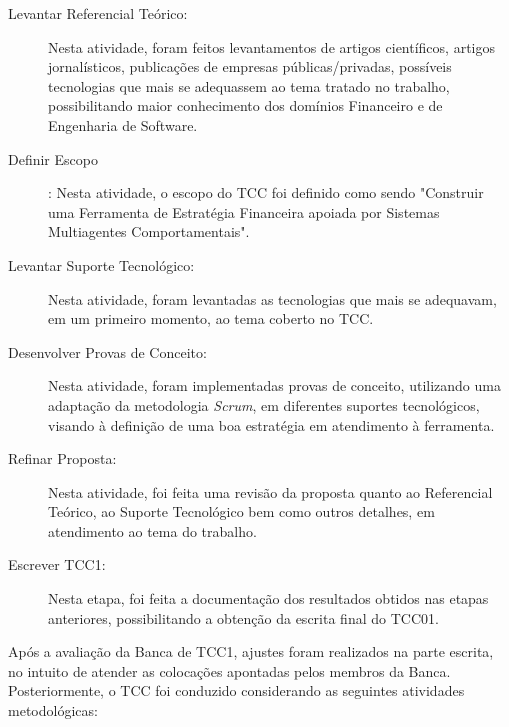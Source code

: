 \begin{description}
\item [Levantar Referencial Teórico:] Nesta atividade, foram feitos levantamentos de artigos científicos, artigos jornalísticos, publicações de empresas públicas/privadas, possíveis tecnologias que mais se adequassem ao tema tratado no trabalho, possibilitando maior conhecimento dos domínios Financeiro e de Engenharia de Software.

\item [Definir Escopo]:
Nesta atividade, o escopo do TCC foi definido como sendo "Construir uma Ferramenta de Estratégia Financeira apoiada por Sistemas Multiagentes Comportamentais".

\item [Levantar Suporte Tecnológico:] 
 Nesta atividade, foram levantadas as tecnologias que mais se adequavam, em um primeiro momento, ao tema coberto no TCC.

\item [Desenvolver Provas de Conceito:]
Nesta atividade, foram implementadas provas de conceito, utilizando uma adaptação da metodologia \textit{Scrum}, em diferentes suportes tecnológicos, visando à definição de uma boa estratégia em atendimento à ferramenta.

\item [Refinar Proposta:] 
Nesta atividade, foi feita uma revisão da proposta quanto ao Referencial Teórico, ao Suporte Tecnológico bem como outros detalhes, em atendimento ao tema do trabalho.

\item [Escrever TCC1:]
Nesta etapa, foi feita a documentação dos resultados obtidos nas etapas anteriores, possibilitando a obtenção da escrita final do TCC01.
\end{description}

Após a avaliação da Banca de TCC1, ajustes foram realizados na parte escrita, no intuito de atender as colocações apontadas pelos membros da Banca. Posteriormente, o TCC foi conduzido considerando as seguintes atividades metodológicas:

